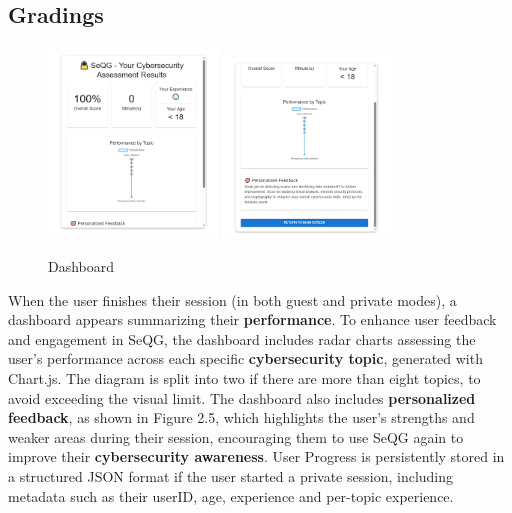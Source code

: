 
\subsection{Gradings}

\begin{figure}[H]
    \centering
    \includegraphics[width=0.4\textwidth]{images/Grading2.png}
    \includegraphics[width=0.4\textwidth]{images/Grading3.png}
    \caption{Dashboard}
\end{figure}
When the user finishes their session (in both guest and private modes), a dashboard appears summarizing their \textbf{performance}. 
To enhance user feedback and engagement in SeQG, the dashboard includes radar charts assessing the user's performance 
across each specific \textbf{cybersecurity topic}, generated with Chart.js. The diagram is split into two if there are more 
than eight topics, to avoid exceeding the visual limit. The dashboard also includes \textbf{personalized feedback}, as 
shown in Figure 2.5, which highlights the user's strengths and weaker areas during their session, encouraging 
them to use SeQG again to improve their \textbf{cybersecurity awareness}. User Progress is persistently stored in a 
structured JSON format if the user started a private session, including metadata such as their userID, age, 
experience and per-topic experience.


